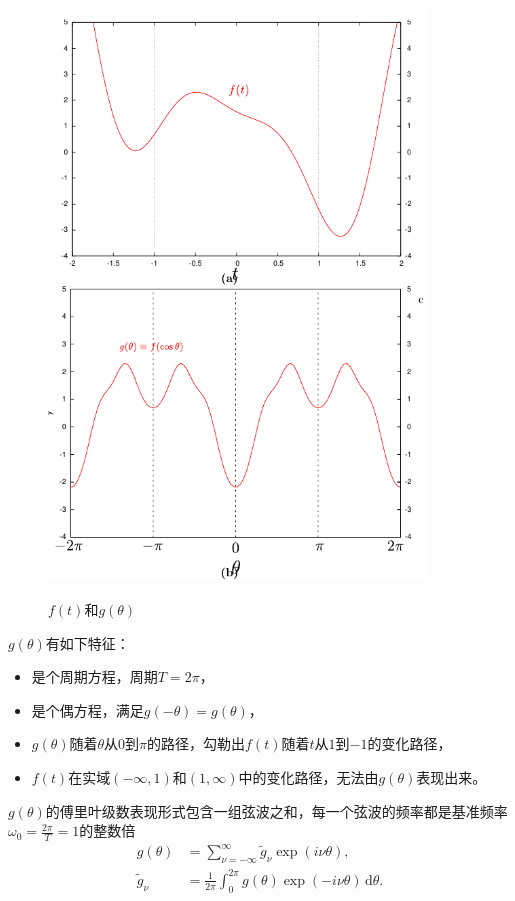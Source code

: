 \begin{figure}[htbp]
   \caption{$f(t)$和$g(\theta)$}
  \centering
  \includegraphics[width=10cm]{./Figures/20180307-ftog.png}
  \label{fig:ninc-cc-rule-transform-problem-ftog}
%
\end{figure}

$g(\theta)$有如下特征：
\begin{itemize}
  \item 是个周期方程，周期$T = 2 \pi$，
  \item 是个偶方程，满足$g(- \theta) = g (\theta)$，
  \item $ g(\theta) $随着$\theta$从$0$到$\pi$的路径，勾勒出$f(t)$随着$t$从$1$到$-1$的变化路径，
  \item  $f(t)$在实域$(-\infty, 1)$和$(1, \infty)$中的变化路径，无法由$g(\theta)$表现出来。
\end{itemize}

$g(\theta)$的傅里叶级数表现形式包含一组弦波之和，每一个弦波的频率都是基准频率$\omega_{0} = \frac{2 \pi}{T} = 1$的整数倍
\begin{equation}
\label{eq:ninc-cc-rule-transform-g-fseries}
\begin{split}
  g(\theta) & = \sum_{\nu = - \infty}^{\infty} \tilde{g}_{\nu} \exp \left( i \nu \theta \right),\\
  \tilde{g}_{\nu} & = \frac{1}{2 \pi} \int_{0}^{2 \pi} g(\theta) \exp \left( - i \nu \theta \right) \, \mathrm{d} \theta.
\end{split}
\end{equation}

